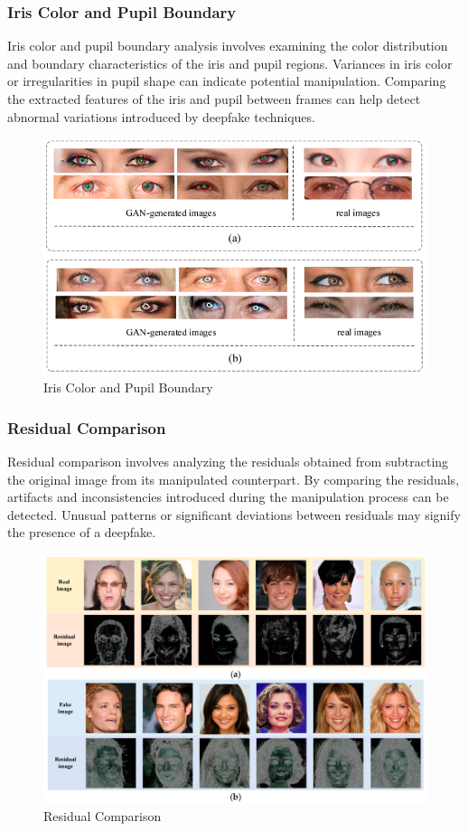 \subsubsection{Iris Color and Pupil Boundary}

Iris color and pupil boundary analysis involves examining the color distribution and boundary characteristics of the iris and pupil regions. Variances in iris color or irregularities in pupil shape can indicate potential manipulation. Comparing the extracted features of the iris and pupil between frames can help detect abnormal variations introduced by deepfake techniques.
\begin{figure}[htbp]
    \centering
    \includegraphics[width=5in]{img/pupil.png}
    \caption{Iris Color and Pupil Boundary}
\end{figure}


\subsubsection{Residual Comparison}

Residual comparison involves analyzing the residuals obtained from subtracting the original image from its manipulated counterpart. By comparing the residuals, artifacts and inconsistencies introduced during the manipulation process can be detected. Unusual patterns or significant deviations between residuals may signify the presence of a deepfake.
\begin{figure}[htbp]
    \centering
    \includegraphics[width=5in]{img/residual.png}
    \caption{Residual Comparison}
\end{figure}


